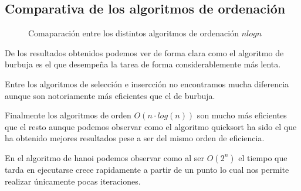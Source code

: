 \documentclass{article}
\begin{document}
\subsection{Comparativa de los algoritmos de ordenación}

\begin{figure}[H]
  \centering   
      \subfloat {%
        
      }
      
      \caption{Comaparación entre los distintos algoritmos de ordenación $nlogn$}
\end{figure}

De los resultados obtenidos podemos ver de forma clara como el
algoritmo de burbuja es el que desempeña la tarea de forma
considerablemente más lenta.

Entre los algoritmos de selección e insercción no encontramos mucha
diferencia aunque son notoriamente más eficientes que el de burbuja.

Finalmente los algoritmos de orden $O(n\cdot log(n))$ son mucho más
eficientes que el resto aunque podemos observar como el algoritmo
quicksort ha sido el que ha obtenido mejores resultados pese a ser del
mismo orden de eficiencia.

En el algoritmo de hanoi podemos observar como al ser $O(2^n)$ el
tiempo que tarda en ejecutarse crece rapidamente a partir de un punto
lo cual nos permite realizar únicamente pocas iteraciones.
\end{document}
